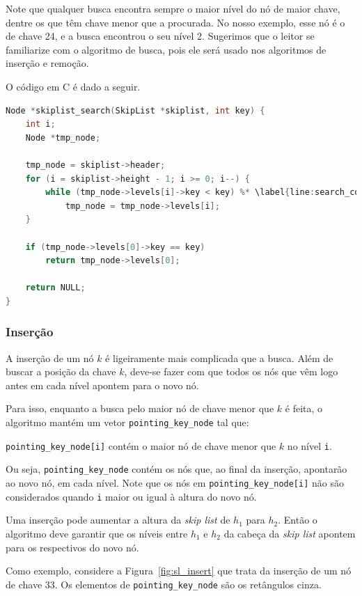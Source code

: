 \documentclass[paper=a4, fontsize=11pt]{scrartcl} %
\numberwithin{equation}{section}
\numberwithin{figure}{section}
\numberwithin{table}{section}
\numberwithin{definition}{section}
\numberwithin{theorem}{section}
\numberwithin{property}{section}
\numberwithin{proposition}{section}
\renewcommand{\sl}{\textit{skip list}\xspace}
\begin{document}
Note que qualquer busca encontra sempre o maior nível do nó de maior chave, dentre os que têm chave menor que a
procurada. No nosso exemplo, esse nó é o de chave 24, e a busca encontrou o seu nível 2. Sugerimos que o leitor
se familiarize com o algoritmo de busca, pois ele será usado nos algoritmos de inserção e remoção.

O código em C é dado a seguir.
\begin{lstlisting}[caption=Busca., language=C]
Node *skiplist_search(SkipList *skiplist, int key) {
    int i;
    Node *tmp_node;

    tmp_node = skiplist->header;
    for (i = skiplist->height - 1; i >= 0; i--) {
        while (tmp_node->levels[i]->key < key) %* \label{line:search_cost} *)
            tmp_node = tmp_node->levels[i];
    }

    if (tmp_node->levels[0]->key == key)
        return tmp_node->levels[0];

    return NULL;
}
\end{lstlisting} \FloatBarrier

\subsubsection{Inserção} \label{sec:ins}

A inserção de um nó $k$ é ligeiramente mais complicada que a busca. Além de buscar a posição da chave $k$,
deve-se fazer com que todos os nós que vêm logo antes em cada nível apontem para o novo nó.

Para isso, enquanto a busca pelo maior nó de chave menor que $k$ é feita, o algoritmo mantém um vetor 
\verb|pointing_key_node| tal que:

\begin{center}
\verb|pointing_key_node[i]| contém o maior nó de chave menor que $k$ no nível \verb|i|.
\end{center}

Ou seja, \verb|pointing_key_node| contém os nós que, ao final da inserção, apontarão ao novo nó, em cada nível.
Note que os nós em \verb|pointing_key_node[i]| não são considerados quando 
\verb|i| maior ou igual à altura do novo nó.

Uma inserção pode aumentar a altura da \sl de $h_1$ para $h_2$. Então o algoritmo deve garantir que os níveis
entre $h_1$ e $h_2$ da cabeça da \sl apontem para os respectivos do novo nó.

Como exemplo, considere a Figura~\ref{fig:sl_insert} que trata da inserção de um nó de chave $33$. Os elementos
de \verb|pointing_key_node| são os retângulos cinza.
\end{document}
